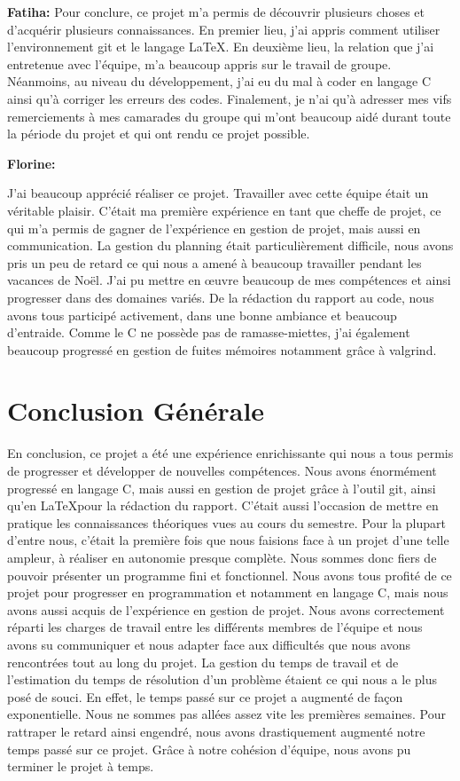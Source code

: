 \documentclass{article}
\begin{document}
\textbf{Fatiha:}
Pour conclure, ce projet m’a permis de découvrir plusieurs choses et d’acquérir plusieurs connaissances.
En premier lieu, j’ai appris comment utiliser l’environnement git et le langage \LaTeX.
En deuxième lieu, la relation que j’ai entretenue avec l’équipe, m’a beaucoup appris sur le travail de groupe.
Néanmoins, au niveau du développement, j’ai eu du mal à coder en langage C ainsi qu'à corriger les erreurs des codes. Finalement, je n’ai qu’à adresser mes vifs remerciements à mes camarades du groupe qui m’ont beaucoup aidé durant toute la période du projet et qui ont rendu ce projet possible.
\medskip

\textbf{Florine:}

J'ai beaucoup apprécié réaliser ce projet. Travailler avec cette équipe était un véritable plaisir. C'était ma première expérience en tant que cheffe de projet, ce qui m'a permis de gagner de l'expérience en gestion de projet, mais aussi en communication. La gestion du planning était particulièrement difficile, nous avons pris un peu de retard ce qui nous a amené à beaucoup travailler pendant les vacances de Noël. 
J'ai pu mettre en œuvre beaucoup de mes compétences et ainsi progresser dans des domaines variés. De la rédaction du rapport au code, nous avons tous participé activement, dans une bonne ambiance et beaucoup d'entraide.
Comme le C ne possède pas de ramasse-miettes, j'ai également beaucoup progressé en gestion de fuites mémoires notamment grâce à valgrind.
\medskip

\clearpage
\section{Conclusion Générale}


En conclusion, ce projet a été une expérience enrichissante qui nous a tous permis de progresser et développer de nouvelles compétences.
\newline
Nous avons énormément progressé en langage C, mais aussi en gestion de projet grâce à l'outil git, ainsi qu'en \LaTeX pour la rédaction du rapport. C'était aussi l'occasion de mettre en pratique les connaissances théoriques vues au cours du semestre.
Pour la plupart d'entre nous, c'était la première fois que nous faisions face à un projet d'une telle ampleur, à réaliser en autonomie presque complète. Nous sommes donc fiers de pouvoir présenter un programme fini et fonctionnel. Nous avons tous profité de ce projet pour progresser en programmation et notamment en langage C, mais nous avons aussi acquis de l'expérience en gestion de projet. 
\newline
Nous avons correctement réparti les charges de travail entre les différents membres de l'équipe et nous avons su communiquer et nous adapter face aux difficultés que nous avons rencontrées tout au long du projet. La gestion du temps de travail et de l'estimation du temps de résolution d'un problème étaient ce qui nous a le plus posé de souci. En effet, le temps passé sur ce projet a augmenté de façon exponentielle. Nous ne sommes pas allées assez vite les premières semaines. Pour rattraper le retard ainsi engendré, nous avons drastiquement augmenté notre temps passé sur ce projet. Grâce à notre cohésion d'équipe, nous avons pu terminer le projet à temps.

	
\end{document}

